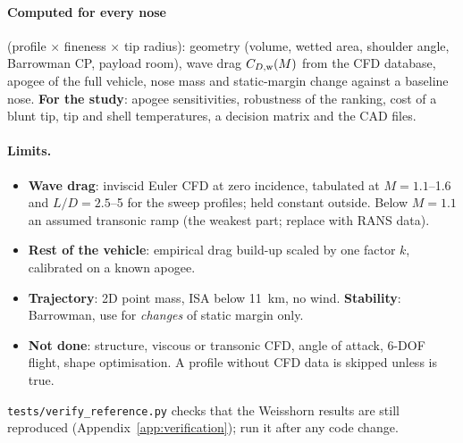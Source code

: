 \paragraph{Computed for every nose} (profile $\times$ fineness $\times$ tip radius): geometry (volume, wetted area,
shoulder angle, Barrowman CP, payload room), wave drag $C_{D,\rm w}(M)$ from the CFD database, apogee of the full
vehicle, nose mass and static-margin change against a baseline nose. \textbf{For the study}: apogee sensitivities,
robustness of the ranking, cost of a blunt tip, tip and shell temperatures, a decision matrix and the CAD files.

\paragraph{Limits.}
\begin{itemize}[leftmargin=*,itemsep=1pt]
\item \textbf{Wave drag}: inviscid Euler CFD at zero incidence, tabulated at $M = 1.1$--1.6 and $L/D = 2.5$--5
for the sweep profiles; held constant outside. Below $M = 1.1$ an assumed transonic ramp (the weakest part; replace with RANS data).
\item \textbf{Rest of the vehicle}: empirical drag build-up scaled by one factor $k$, calibrated on a known apogee.
\item \textbf{Trajectory}: 2D point mass, ISA below \SI{11}{km}, no wind. \textbf{Stability}: Barrowman, use for
\emph{changes} of static margin only.
\item \textbf{Not done}: structure, viscous or transonic CFD, angle of attack, 6-DOF flight, shape optimisation.
A profile without CFD data is skipped unless  is true.
\end{itemize}
\texttt{tests/verify\_reference.py} checks that the Weisshorn results are still reproduced
(Appendix~\ref{app:verification}); run it after any code change.
